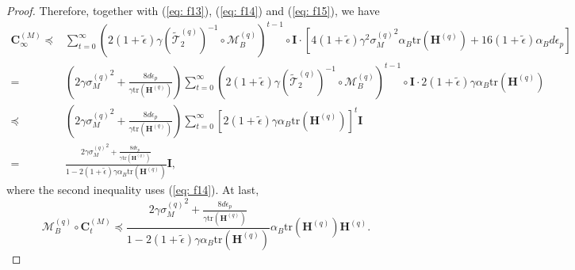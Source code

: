 \documentclass[11pt, letterpaper]{article}
\begin{document}
\begin{proof}
    Therefore, together with (\ref{eq: f13}), (\ref{eq: f14}) and (\ref{eq: f15}), we have
    \begin{equation*}
        \begin{aligned}
            \mathbf{C}_{\infty}^{(M)}\preceq&\sum_{t=0}^\infty\left(2(1+\tilde{\epsilon})\gamma(\widetilde{\mathcal{T}}_2^{(q)})^{-1}\circ\mathcal{M}_B^{(q)}\right)^{t-1}\circ \mathbf{I}
            \cdot\left[4(1+\tilde{\epsilon})\gamma^2{\sigma_{M}^{(q)}}^2\alpha_B\mathrm{tr}(\mathbf{H}^{(q)})+16(1+\tilde{\epsilon})\alpha_B d\epsilon_p\right]\\
            =&\left(2\gamma{\sigma_M^{(q)}}^2+\frac{8d\epsilon_p}{\gamma\mathrm{tr}(\mathbf{H}^{(q)})}\right) \sum_{t=0}^\infty\left(2(1+\tilde{\epsilon})\gamma(\widetilde{\mathcal{T}}_2^{(q)})^{-1}\circ\mathcal{M}_B^{(q)}\right)^{t-1}\circ \mathbf{I}\cdot2(1+\tilde{\epsilon})\gamma\alpha_B\mathrm{tr}(\mathbf{H}^{(q)})\\
            \preceq&\left(2\gamma{\sigma_M^{(q)}}^2+\frac{8d\epsilon_p}{\gamma\mathrm{tr}(\mathbf{H}^{(q)})}\right) \sum_{t=0}^\infty\left[2(1+\tilde{\epsilon})\gamma\alpha_B\mathrm{tr}(\mathbf{H}^{(q)})\right]^{t} \mathbf{I}\\
            =&\frac{2\gamma{\sigma_M^{(q)}}^2+\frac{8d\epsilon_p}{\gamma\mathrm{tr}(\mathbf{H}^{(q)})}}{1-2(1+\tilde{\epsilon})\gamma\alpha_B\mathrm{tr}(\mathbf{H}^{(q)})}\mathbf{I},
        \end{aligned}
    \end{equation*}
    where the second inequality uses (\ref{eq: f14}). At last,
    \begin{equation*}
        \mathcal{M}_B^{(q)} \circ \mathbf{C}_t^{(M)} \preceq\frac{2\gamma{\sigma_M^{(q)}}^2+\frac{8d\epsilon_p}{\gamma\mathrm{tr}(\mathbf{H}^{(q)})}}{1-2(1+\tilde{\epsilon})\gamma\alpha_B\mathrm{tr}(\mathbf{H}^{(q)})}\alpha_B\mathrm{tr}(\mathbf{H}^{(q)})\mathbf{H}^{(q)}.
    \end{equation*}
\end{proof}
\end{document}
